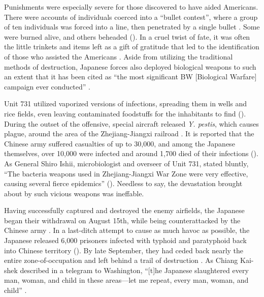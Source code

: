 \documentclass[12pt, a4paper, twoside]{article}
\begin{document}
Punishments were especially severe for those discovered to have aided Americans. There were accounts of individuals coerced into a “bullet contest”, where a group of ten individuals was forced into a line, then penetrated by a single bullet \autocite[p.\ 384]{Scott2015TargetTokyo}. Some were burned alive, and others beheaded (\cites[p.\ 384]{Scott2015TargetTokyo}{ChinaDaily2015VillagersHelpedSavePilots}). In a cruel twist of fate, it was often the little trinkets and items left as a gift of gratitude that led to the identification of those who assisted the Americans \autocite{ChinaDaily2015VillagersHelpedSavePilots}. Aside from utilizing the traditional methods of destruction, Japanese forces also deployed biological weapons to such an extent that it has been cited as “the most significant BW [Biological Warfare] campaign ever conducted” \autocite[p.\ 19]{Carus2017ShortHistoryBioWarfare}.

Unit 731 utilized vaporized versions of infections, spreading them in wells and rice fields, even leaving contaminated foodstuffs for the inhabitants to find (\cites[p.\ 138]{Tanaka1996HiddenHorrors}[p.\ 19]{ChevrierEtAl2006BTWCProceedings}[p.\ 18]{Carus2017ShortHistoryBioWarfare}). During the outset of the offensive, special aircraft released \emph{Y. pestis}, which causes plague, around the area of the Zhejiang-Jiangxi railroad \autocite[p.\ 18]{Carus2017ShortHistoryBioWarfare}. It is reported that the Chinese army suffered casualties of up to 30,000, and among the Japanese themselves, over 10,000 were infected and around 1,700 died of their infections (\cites[p.\ 427]{Tohmatsu2010StrategicCorrelation}). As General Shiro Ishii, microbiologist and overseer of Unit 731, stated bluntly, “The bacteria weapons used in Zhejiang-Jiangxi War Zone were very effective, causing several fierce epidemics” (\cites{PacificAtrocities2024BacteriologicalWarfareChina}{PBS2024ShiroIshii}). Needless to say, the devastation brought about by such vicious weapons was ineffable.

Having successfully captured and destroyed the enemy airfields, the Japanese began their withdrawal on August 15th, while being counterattacked by the Chinese army \autocite[p.\ 12]{Sherry1996ChinaDefensive}. In a last-ditch attempt to cause as much havoc as possible, the Japanese released 6,000 prisoners infected with typhoid and paratyphoid back into Chinese territory (\cites[p.\ 18]{Carus2017ShortHistoryBioWarfare}[pp.\ 160, 169]{Yin2002RapeOfBiologicalWarfare}). By late September, they had ceded back nearly the entire zone-of-occupation and left behind a trail of destruction \autocite[p.\ 2250]{XiongZhou2000GreatDictionaryMilitary}. As Chiang Kai-shek described in a telegram to Washington, “[t]he Japanese slaughtered every man, woman, and child in these areas—let me repeat, every man, woman, and child” \autocite{Scott2015SmithsonianUntoldStory}.
\end{document}
